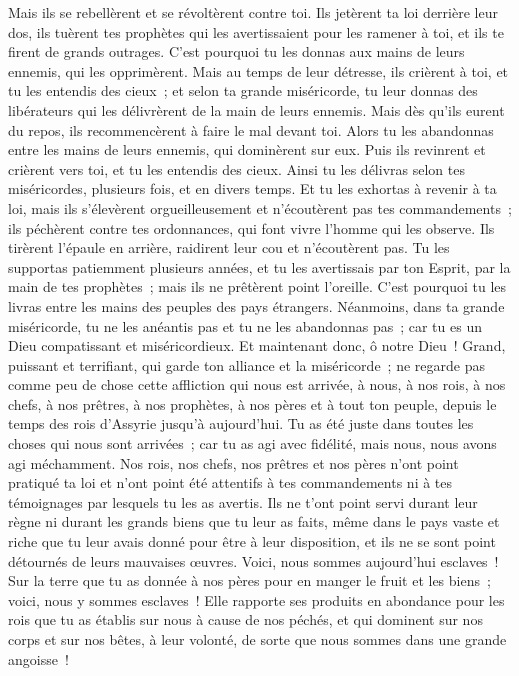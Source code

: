 \begin{multicols}{2}
Mais ils se rebellèrent et se révoltèrent contre toi. Ils jetèrent ta loi derrière leur dos, ils tuèrent tes prophètes qui les avertissaient pour les ramener à toi, et ils te firent de grands outrages.
C'est pourquoi tu les donnas aux mains de leurs ennemis, qui les opprimèrent. Mais au temps de leur détresse, ils crièrent à toi, et tu les entendis des cieux~; et selon ta grande miséricorde, tu leur donnas des libérateurs qui les délivrèrent de la main de leurs ennemis.
Mais dès qu'ils eurent du repos, ils recommencèrent à faire le mal devant toi. Alors tu les abandonnas entre les mains de leurs ennemis, qui dominèrent sur eux. Puis ils revinrent et crièrent vers toi, et tu les entendis des cieux. Ainsi tu les délivras selon tes miséricordes, plusieurs fois, et en divers temps.
Et tu les exhortas à revenir à ta loi, mais ils s'élevèrent orgueilleusement et n'écoutèrent pas tes commandements~; ils péchèrent contre tes ordonnances, qui font vivre l'homme qui les observe. Ils tirèrent l'épaule en arrière, raidirent leur cou et n'écoutèrent pas.
Tu les supportas patiemment plusieurs années, et tu les avertissais par ton Esprit, par la main de tes prophètes~; mais ils ne prêtèrent point l'oreille. C'est pourquoi tu les livras entre les mains des peuples des pays étrangers.
Néanmoins, dans ta grande miséricorde, tu ne les anéantis pas et tu ne les abandonnas pas~; car tu es un Dieu compatissant et miséricordieux.
Et maintenant donc, ô notre Dieu~! Grand, puissant et terrifiant, qui garde ton alliance et la miséricorde~; ne regarde pas comme peu de chose cette affliction qui nous est arrivée, à nous, à nos rois, à nos chefs, à nos prêtres, à nos prophètes, à nos pères et à tout ton peuple, depuis le temps des rois d'Assyrie jusqu'à aujourd'hui.
Tu as été juste dans toutes les choses qui nous sont arrivées~; car tu as agi avec fidélité, mais nous, nous avons agi méchamment.
Nos rois, nos chefs, nos prêtres et nos pères n'ont point pratiqué ta loi et n'ont point été attentifs à tes commandements ni à tes témoignages par lesquels tu les as avertis.
Ils ne t'ont point servi durant leur règne ni durant les grands biens que tu leur as faits, même dans le pays vaste et riche que tu leur avais donné pour être à leur disposition, et ils ne se sont point détournés de leurs mauvaises œuvres.
Voici, nous sommes aujourd'hui esclaves~! Sur la terre que tu as donnée à nos pères pour en manger le fruit et les biens~; voici, nous y sommes esclaves~!
Elle rapporte ses produits en abondance pour les rois que tu as établis sur nous à cause de nos péchés, et qui dominent sur nos corps et sur nos bêtes, à leur volonté, de sorte que nous sommes dans une grande angoisse~!

\end{multicols}
